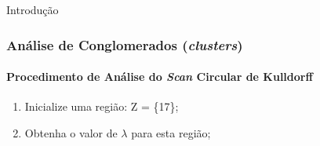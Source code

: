 \documentclass[aspectratio=169]{beamer}
\begin{document}
\begin{frame}{Introdução}
\frametitle{Análise de Conglomerados (\textit{clusters})}
\framesubtitle{Procedimento de Análise do \textit{Scan} Circular de Kulldorff}

\fboxsep=0pt
\noindent
\begin{minipage}[t]{0.48\linewidth}
\begin{enumerate}
\item Inicialize uma região: Z = \{17\};
\item Obtenha o valor de $\lambda$ para esta região;
\end{enumerate}
\end{minipage}
\hfill%


\end{frame}
\end{document}
